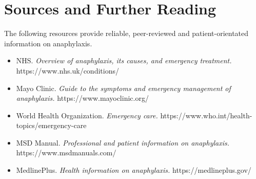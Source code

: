 \section*{Sources and Further Reading}
The following resources provide reliable, peer-reviewed and patient-orientated information on anaphylaxis.

\begin{itemize}
    \item NHS. \textit{Overview of anaphylaxis, its causes, and emergency treatment.} https://www.nhs.uk/conditions/
    \item Mayo Clinic. \textit{Guide to the symptoms and emergency management of anaphylaxis.} https://www.mayoclinic.org/
    \item World Health Organization. \textit{Emergency care.} https://www.who.int/health-topics/emergency-care
    \item MSD Manual. \textit{Professional and patient information on anaphylaxis.} https://www.msdmanuals.com/
    \item MedlinePlus. \textit{Health information on anaphylaxis.} https://medlineplus.gov/
\end{itemize}
